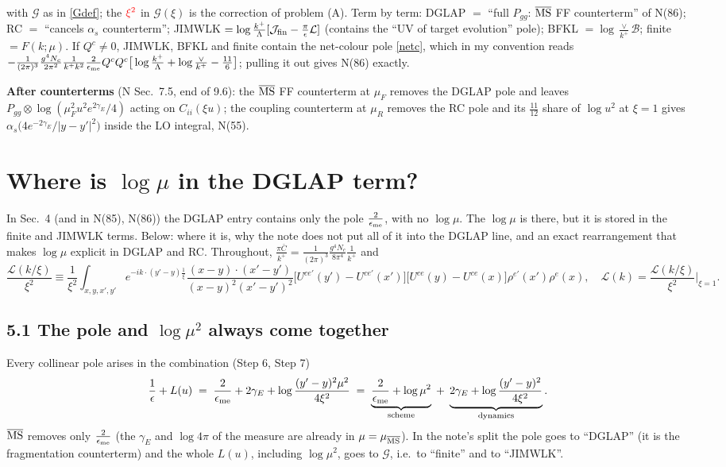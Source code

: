 \documentclass[10pt]{article}
\numberwithin{equation}{section}
\newcommand{\Wop}[2]{\big[U^{ce'}(#2)-U^{ce'}(x')\big]\big[U^{ce}(#1)-U^{ce}(x)\big]\rho^{e'}(x')\rho^{e}(x)}
\newcommand{\Kx}[2]{\frac{(x-#1)\cdot(x'-#2)}{(x-#1)^{2}(x'-#2)^{2}}}
\newcommand{\Cb}{\bar C}
\newcommand{\Lc}{\mathcal L}
\newcommand{\Jc}{\mathcal J}
\newcommand{\Bc}{\mathcal B}
\newcommand{\red}[1]{{\color{red}#1}}
\begin{document}
with $\mathcal G$ as in \eqref{Gdef}; the $\red{\xi^2}$ in $\mathcal G(\xi)$ is the correction of problem (A).
Term by term: DGLAP $=$ ``full $P_{gg}$: $\overline{\rm MS}$ FF counterterm'' of N(86); RC $=$ ``cancels $\alpha_s$ counterterm'';
JIMWLK $=\log\frac{k^+}{\Lambda}[\Jc_{\rm fin}-\frac\pi\epsilon\Lc]$ (contains the ``UV of target evolution'' pole);
BFKL $=\log\frac{\vee}{k^+}\Bc$; finite $=F(k;\mu)$. If $Q^c\neq0$, JIMWLK, BFKL and finite contain the net-colour pole
\eqref{netc}, which in my convention reads
$-\frac{1}{(2\pi)^3}\frac{g^4N_c}{2\pi^2}\frac{1}{k^+k^2}\frac{2}{\epsilon_{\rm me}}Q^cQ^c\big[\log\frac{k^+}{\Lambda}+\log\frac{\vee}{k^+}-\frac{11}{6}\big]$;
pulling it out gives N(86) exactly.

\textbf{After counterterms} (N Sec.~7.5, end of 9.6): the $\overline{\rm MS}$ FF counterterm at $\mu_F$ removes the DGLAP pole and
leaves $P_{gg}\otimes\log(\mu_F^2u^2e^{2\gamma_E}/4)$ acting on $C_{ii}(\xi u)$; the coupling counterterm at $\mu_R$ removes the RC
pole and its $\frac{11}{12}$ share of $\log u^2$ at $\xi=1$ gives $\alpha_s\big(4e^{-2\gamma_E}/|y-y'|^2\big)$ inside the LO integral, N(55).

\section{Where is $\log\mu$ in the DGLAP term?}
In Sec.~4 (and in N(85), N(86)) the DGLAP entry contains only the pole $\frac{2}{\epsilon_{\rm me}}$, with no $\log\mu$.
The $\log\mu$ is there, but it is stored in the finite and JIMWLK terms. Below: where it is, why the note does
not put all of it into the DGLAP line, and an exact rearrangement that makes $\log\mu$ explicit in DGLAP and RC.
Throughout, $\frac{\pi\Cb}{k^+}=\frac{1}{(2\pi)^3}\frac{g^4N_c}{8\pi^4}\frac{1}{k^+}$ and
\begin{equation}
\frac{\Lc(k/\xi)}{\xi^2}\equiv\frac{1}{\xi^2}\int_{x,y,x',y'}e^{-ik\cdot(y'-y)\frac1\xi}\Kx{y}{y'}\Wop{y}{y'},\quad
\Lc(k)=\frac{\Lc(k/\xi)}{\xi^2}\Big|_{\xi=1}.
\end{equation}

\subsection*{5.1 The pole and $\log\mu^2$ always come together}
Every collinear pole arises in the combination (Step 6, Step 7)
\begin{equation}
\frac{1}{\epsilon}+L(u)\;=\;\frac{2}{\epsilon_{\rm me}}+2\gamma_E+\log\frac{(y'-y)^2\mu^2}{4\xi^2}
\;=\;\underbrace{\frac{2}{\epsilon_{\rm me}}+\log\mu^2}_{\text{scheme}}\;+\;\underbrace{2\gamma_E+\log\frac{(y'-y)^2}{4\xi^2}}_{\text{dynamics}} .
\end{equation}
$\overline{\rm MS}$ removes only $\frac{2}{\epsilon_{\rm me}}$ (the $\gamma_E$ and $\log4\pi$ of the measure are already in $\mu=\mu_{\overline{\rm MS}}$).
In the note's split the pole goes to ``DGLAP'' (it is the fragmentation counterterm) and the whole $L(u)$, including
$\log\mu^2$, goes to $\mathcal G$, i.e.\ to ``finite'' and to ``JIMWLK''.
\end{document}
